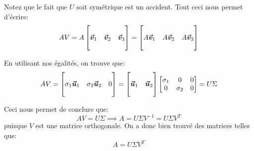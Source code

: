 \documentclass[a4paper]{article}
\begin{document}
{    Notez que le fait que $U$ soit symétrique est un accident. Tout ceci nous permet d'écrire:
    \[A V = A \begin{bmatrix}  &  &  \\ \bm{\protect\vec{v}}_1 & \bm{\protect\vec{v}}_2 & \bm{\protect\vec{v}}_3 \\  &  &  \end{bmatrix} = \begin{bmatrix}  &  &  \\ A \bm{\protect\vec{v}}_1 & A \bm{\protect\vec{v}}_2 & A \bm{\protect\vec{v}}_3 \\  &  &  \end{bmatrix} \]

    En utilisant nos égalités, on trouve que:
    \[AV = \begin{bmatrix}  &  &  \\ \sigma_1 \bm{\protect\vec{u}}_1 & \sigma_2 \bm{\protect\vec{u}}_2 & 0 \\  &  &  \end{bmatrix} = \begin{bmatrix}  &  \\ \bm{\protect\vec{u}}_1 & \bm{\protect\vec{u}}_2 \\  &  \end{bmatrix}  \begin{bmatrix} \sigma_1 & 0 & 0 \\ 0 & \sigma_2 & 0 \end{bmatrix} = U \Sigma \]

    Ceci nous permet de conclure que:
    \[AV = U \Sigma \implies A = U \Sigma V^{-1} = U \Sigma V^T\]
    puisque $V$ est une matrice orthogonale. On a donc bien trouvé des matrices telles que:
    \[A = U \Sigma V^T\]
}
\end{document}
